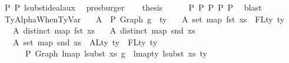 \begin{isabellebody}
\ P{}\ P{}\ lsubst{\isacharunderscore}{\kern0pt}ideal{\isacharunderscore}{\kern0pt}aux\ \isamarkupfalse%
\ presburger\isanewline
\isanewline
\ \ \isamarkupfalse%
\ {\isacharquery}{\kern0pt}thesis\isanewline
\ \ \ \ \isamarkupfalse%
\ P{}{}\ P{}\ P{}\ P{}\ P{}\ \isamarkupfalse%
\ blast\isanewline
{}\isamarkupfalse%
%
\endisatagproof
{\isafoldproof}%
%
\isadelimproof
\isanewline
%
\endisadelimproof
\isanewline
\isanewline
\isanewline
{}\isamarkupfalse%
\ TyAlphaWhenTyVar{\isacharcolon}{\kern0pt}\isanewline
\ \ \ A{}{\isacharcolon}{\kern0pt}\ {\isachardoublequoteopen}{\isasymGamma}\ {\isasymturnstile}{\isacharbraceleft}{\kern0pt}P{\isacharbraceright}{\kern0pt}\ Graph\ g\ {\isacharcolon}{\kern0pt}\ ty{\isachardoublequoteclose}\isanewline
\ \ \ A{}{\isacharcolon}{\kern0pt}\ {\isachardoublequoteopen}set\ {\isacharparenleft}{\kern0pt}map\ fst\ xs{\isacharparenright}{\kern0pt}\ {\isacharequal}{\kern0pt}\ FLty\ ty{\isachardoublequoteclose}\isanewline
\ \ \ A{}{\isacharcolon}{\kern0pt}\ {\isachardoublequoteopen}distinct\ {\isacharparenleft}{\kern0pt}map\ fst\ xs{\isacharparenright}{\kern0pt}{\isachardoublequoteclose}\isanewline
\ \ \ A{}{\isacharcolon}{\kern0pt}\ {\isachardoublequoteopen}distinct\ {\isacharparenleft}{\kern0pt}map\ snd\ xs{\isacharparenright}{\kern0pt}{\isachardoublequoteclose}\isanewline
\ \ \ A{}{\isacharcolon}{\kern0pt}\ {\isachardoublequoteopen}set\ {\isacharparenleft}{\kern0pt}map\ snd\ xs{\isacharparenright}{\kern0pt}\ {\isasyminter}\ ALty\ ty\ {\isacharminus}{\kern0pt}\ FLty\ ty\ {\isacharequal}{\kern0pt}\ {\isacharbraceleft}{\kern0pt}{\isacharbraceright}{\kern0pt}{\isachardoublequoteclose}\isanewline
\ \ \ \ \ {\isachardoublequoteopen}{\isasymGamma}\ {\isasymturnstile}{\isacharbraceleft}{\kern0pt}P{\isacharbraceright}{\kern0pt}\ Graph\ {\isacharparenleft}{\kern0pt}lmap\ {\isacharparenleft}{\kern0pt}lsubst\ xs{\isacharparenright}{\kern0pt}\ g{\isacharparenright}{\kern0pt}\ {\isacharcolon}{\kern0pt}\ lmap{\isacharunderscore}{\kern0pt}ty\ {\isacharparenleft}{\kern0pt}lsubst\ xs{\isacharparenright}{\kern0pt}\ ty{\isachardoublequoteclose}\isanewline
%
\isadelimproof
%
\endisadelimproof
%
\isatagproof
{}\isamarkupfalse%
\ {\isacharminus}{\kern0pt}\isanewline

\end{isabellebody}
